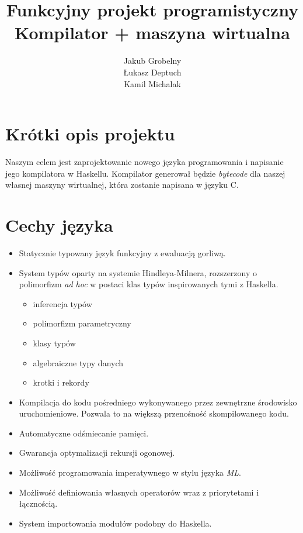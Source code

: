 \documentclass[12pt, a4paper, oneside]{report}
\title{\Huge Funkcyjny projekt programistyczny\\
       \Large Kompilator + maszyna wirtualna}
\author{Jakub Grobelny\\ Łukasz Deptuch\\ Kamil Michalak}
\date{}
\begin{document}
\begin{titlepage}
    \maketitle
    \thispagestyle{empty}
\end{titlepage}

\section*{Krótki opis projektu}
Naszym celem jest zaprojektowanie nowego języka programowania i napisanie 
jego kompilatora w Haskellu. Kompilator generował będzie \textit{bytecode} dla
naszej własnej maszyny wirtualnej, która zostanie napisana w języku C.

\section*{Cechy języka}
\begin{itemize}
    \item Statycznie typowany język funkcyjny z ewaluacją gorliwą.
    \item System typów oparty na systemie Hindleya-Milnera, rozszerzony o 
          polimorfizm \textit{ad hoc} w postaci klas typów inspirowanych 
          tymi z Haskella.
    \begin{itemize}
        \item inferencja typów
        \item polimorfizm parametryczny
        \item klasy typów
        \item algebraiczne typy danych
        \item krotki i rekordy
    \end{itemize}
    \item Kompilacja do kodu pośredniego wykonywanego przez zewnętrzne 
          środowisko uruchomieniowe. Pozwala to na większą przenośność
          skompilowanego kodu.
    \item Automatyczne odśmiecanie pamięci.
    \item Gwarancja optymalizacji rekursji ogonowej.
    \item Możliwość programowania imperatywnego w stylu języka \textit{ML}.
    \item Możliwość definiowania własnych operatorów wraz z priorytetami i 
          łącznością.
    \item System importowania modułów podobny do Haskella.
\end{itemize}
\end{document}
